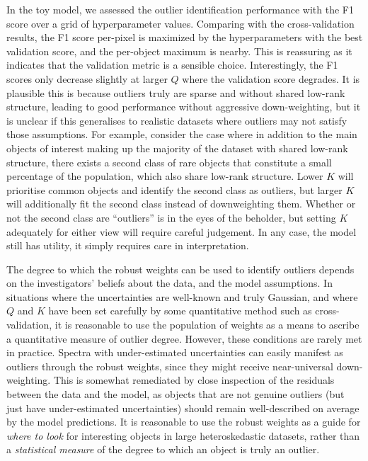 \documentclass[onecolumn,floatfix,linenumbers,trackchanges]{aastex631}
\begin{document}
In the toy model, we assessed the outlier identification performance with the F1 score over a grid of hyperparameter values.
Comparing with the cross-validation results, the F1 score per-pixel is maximized by the hyperparameters with the best validation score, and the per-object maximum is nearby.
This is reassuring as it indicates that the validation metric is a sensible choice.
Interestingly, the F1 scores only decrease slightly at larger $Q$ where the validation score degrades.
It is plausible this is because outliers truly are sparse and without shared low-rank structure, leading to good performance without aggressive down-weighting, but it is unclear if this generalises to realistic datasets where outliers may not satisfy those assumptions. 
For example, consider the case where in addition to the main objects of interest making up the majority of the dataset with shared low-rank structure, there exists a second class of rare objects that constitute a small percentage of the population, which also share low-rank structure.
Lower $K$ will prioritise common objects and identify the second class as outliers, but larger $K$ will additionally fit the second class instead of downweighting them.
Whether or not the second class are ``outliers'' is in the eyes of the beholder, but setting $K$ adequately for either view will require careful judgement. 
In any case, the model still has utility, it simply requires care in interpretation.


The degree to which the robust weights can be used to identify outliers depends on the investigators' beliefs about the data, and the model assumptions.
In situations where the uncertainties are well-known and truly Gaussian, and where $Q$ and $K$ have been set carefully by some quantitative method such as cross-validation, it is reasonable to use the population of weights as a means to ascribe a quantitative measure of outlier degree. 
However, these conditions are rarely met in practice. 
Spectra with under-estimated uncertainties can easily manifest as outliers through the robust weights, since they might receive near-universal down-weighting. 
This is somewhat remediated by close inspection of the residuals between the data and the model, as objects that are not genuine outliers (but just have under-estimated uncertainties) should remain well-described on average by the model predictions. 
It is reasonable to use the robust weights as a guide for \emph{where to look} for interesting objects in large heteroskedastic datasets, rather than a \emph{statistical measure} of the degree to which an object is truly an outlier.
\end{document}
